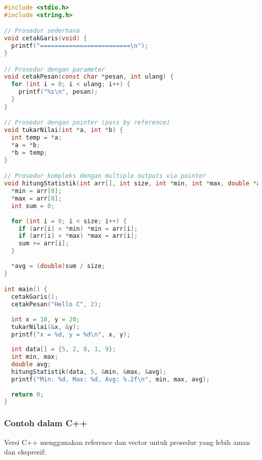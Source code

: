 \documentclass[../main.tex]{subfiles}
\begin{document}
\begin{lstlisting}[language=C, caption={Definisi prosedur (C)}]
#include <stdio.h>
#include <string.h>

// Prosedur sederhana
void cetakGaris(void) {
  printf("=========================\n");
}

// Prosedur dengan parameter
void cetakPesan(const char *pesan, int ulang) {
  for (int i = 0; i < ulang; i++) {
    printf("%s\n", pesan);
  }
}

// Prosedur dengan pointer (pass by reference)
void tukarNilai(int *a, int *b) {
  int temp = *a;
  *a = *b;
  *b = temp;
}

// Prosedur kompleks dengan multiple outputs via pointer
void hitungStatistik(int arr[], int size, int *min, int *max, double *avg) {
  *min = arr[0];
  *max = arr[0];
  int sum = 0;
  
  for (int i = 0; i < size; i++) {
    if (arr[i] < *min) *min = arr[i];
    if (arr[i] > *max) *max = arr[i];
    sum += arr[i];
  }
  
  *avg = (double)sum / size;
}

int main() {
  cetakGaris();
  cetakPesan("Hello C", 2);
  
  int x = 10, y = 20;
  tukarNilai(&x, &y);
  printf("x = %d, y = %d\n", x, y);
  
  int data[] = {5, 2, 8, 1, 9};
  int min, max;
  double avg;
  hitungStatistik(data, 5, &min, &max, &avg);
  printf("Min: %d, Max: %d, Avg: %.2f\n", min, max, avg);
  
  return 0;
}
\end{lstlisting}

\subsubsection{Contoh dalam C++}

Versi C++ menggunakan reference dan vector untuk prosedur yang lebih aman dan ekspresif:
\end{document}
